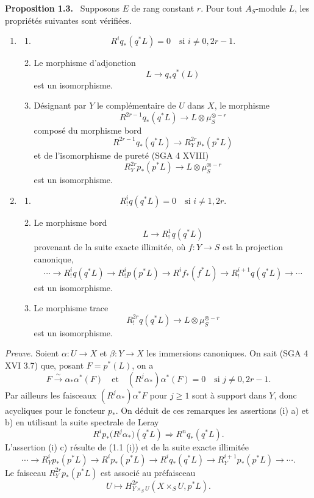 \documentclass[11pt]{article}
\newenvironment{statement}[1]{\par\medskip\noindent\textbf{#1.}\ }{\par\medskip}
\begin{document}
\begin{statement}{Proposition 1.3}
Supposons $E$ de rang constant $r$. Pour tout $A_S$-module $L$, les propriétés suivantes sont vérifiées.
\begin{enumerate}[label=(\roman*)]
\item
\begin{enumerate}[label=\alph*)]
\item
\[
R^i q_*(q^*L)=0\quad\text{si }i\ne 0,2r-1.
\]
\item Le morphisme d'adjonction
\[
L\longrightarrow q_*q^*(L)
\]
est un isomorphisme.
\item Désignant par $Y$ le complémentaire de $U$ dans $X$, le morphisme
\[
R^{2r-1}q_*(q^*L)\longrightarrow L\otimes\mu_S^{\otimes -r}
\]
composé du morphisme bord
\[
R^{2r-1}q_*(q^*L)\longrightarrow R_Y^{2r}p_*(p^*L)
\tag{1}
\]
et de l'isomorphisme de pureté (SGA 4 XVIII)
\[
R_Y^{2r}p_*(p^*L)\longrightarrow L\otimes\mu_S^{\otimes -r}
\]
est un isomorphisme.
\end{enumerate}
\item
\begin{enumerate}[label=\alph*)]
\item
\[
R_!^i q(q^*L)=0\quad\text{si }i\ne 1,2r.
\]
\item Le morphisme bord
\[
L\longrightarrow R_!^1 q(q^*L)
\]
provenant de la suite exacte illimitée, où $f:Y\to S$ est la projection canonique,
\[
\cdots\longrightarrow R_!^i q(q^*L)\longrightarrow R_!^i p(p^*L)
\longrightarrow R^i f_*(f^*L)\longrightarrow R_!^{i+1}q(q^*L)\longrightarrow\cdots
\]
est un isomorphisme.
\item Le morphisme trace
\[
R_!^{2r}q(q^*L)\longrightarrow L\otimes\mu_S^{\otimes -r}
\]
est un isomorphisme.
\end{enumerate}
\end{enumerate}
\end{statement}

\emph{Preuve.} Soient $\alpha:U\to X$ et $\beta:Y\to X$ les immersions canoniques. On sait (SGA 4 XVI 3.7) que, posant $F=p^*(L)$, on a
\[
F\xrightarrow{\sim}\alpha_*\alpha^*(F)
\quad\text{et}\quad
(R^j\alpha_*)\alpha^*(F)=0\quad\text{si }j\ne0,2r-1.
\]
Par ailleurs les faisceaux $(R^j\alpha_*)\alpha^*F$ pour $j\ge1$ sont à support dans $Y$, donc acycliques pour le foncteur $p_*$. On déduit de ces remarques les assertions (i) a) et b) en utilisant la suite spectrale de Leray
\[
R^i p_*\bigl(R^j\alpha_*\bigr)(q^*L)\Longrightarrow R^n q_*(q^*L).
\]
L'assertion (i) c) résulte de (1.1 (i)) et de la suite exacte illimitée
\[
\cdots\longrightarrow R_Y^i p_*(p^*L)\longrightarrow R^i p_*(p^*L)\longrightarrow R^i q_*(q^*L)
\longrightarrow R_Y^{i+1}p_*(p^*L)\longrightarrow\cdots.
\]
Le faisceau $R_Y^{2r}p_*(p^*L)$ est associé au préfaisceau
\[
U\longmapsto H^{2r}_{Y\times_S U}(X\times_S U,p^*L).
\]
\end{document}
